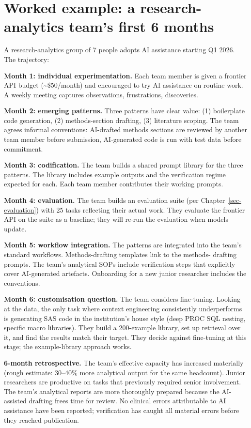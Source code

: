 \documentclass[
  letterpaper,
  11pt]{scrbook}
\begin{document}
\section{Worked example: a research-analytics team's first 6
months}\label{worked-example-a-research-analytics-teams-first-6-months}

A research-analytics group of 7 people adopts AI assistance starting Q1
2026. The trajectory:

\textbf{Month 1: individual experimentation.} Each team member is given
a frontier API budget (\textasciitilde\$50/month) and encouraged to try
AI assistance on routine work. A weekly meeting captures observations,
frustrations, discoveries.

\textbf{Month 2: emerging patterns.} Three patterns have clear value:
(1) boilerplate code generation, (2) methods-section drafting, (3)
literature scoping. The team agrees informal conventions: AI-drafted
methods sections are reviewed by another team member before submission,
AI-generated code is run with test data before commitment.

\textbf{Month 3: codification.} The team builds a shared prompt library
for the three patterns. The library includes example outputs and the
verification regime expected for each. Each team member contributes
their working prompts.

\textbf{Month 4: evaluation.} The team builds an evaluation suite (per
Chapter~\ref{sec-evaluation}) with 25 tasks reflecting their actual
work. They evaluate the frontier API on the suite as a baseline; they
will re-run the evaluation when models update.

\textbf{Month 5: workflow integration.} The patterns are integrated into
the team's standard workflows. Methods-drafting templates link to the
methods- drafting prompts. The team's analytical SOPs include
verification steps that explicitly cover AI-generated artefacts.
Onboarding for a new junior researcher includes the conventions.

\textbf{Month 6: customisation question.} The team considers
fine-tuning. Looking at the data, the only task where context
engineering consistently underperforms is generating SAS code in the
institution's house style (deep PROC SQL nesting, specific macro
libraries). They build a 200-example library, set up retrieval over it,
and find the results match their target. They decide against fine-tuning
at this stage; the example-library approach works.

\textbf{6-month retrospective.} The team's effective capacity has
increased materially (rough estimate: 30--40\% more analytical output
for the same headcount). Junior researchers are productive on tasks that
previously required senior involvement. The team's analytical reports
are more thoroughly prepared because the AI-assisted drafting frees time
for review. No clinical errors attributable to AI assistance have been
reported; verification has caught all material errors before they
reached publication.
\end{document}
